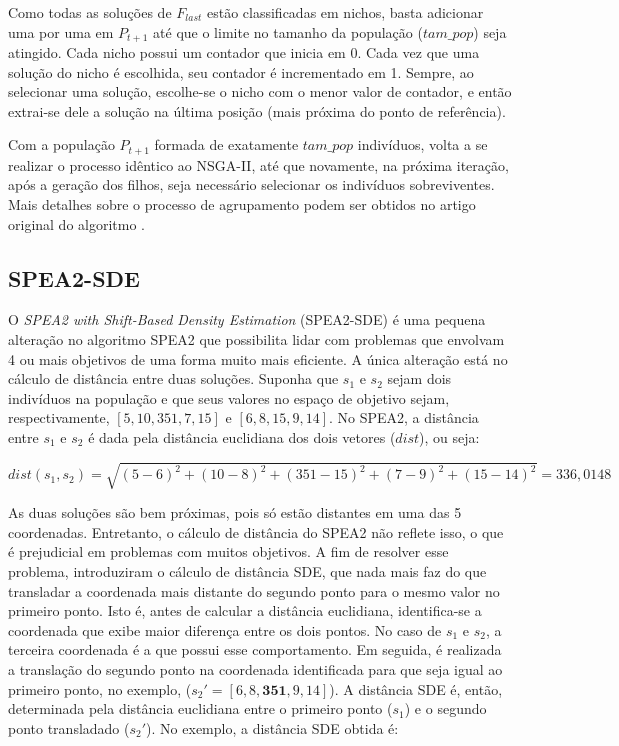 Como todas as soluções de $F_{last}$ estão classificadas em nichos, basta adicionar uma por uma em $P_{t+1}$ até que o limite no tamanho da população ($tam\_pop$) seja atingido. Cada nicho possui um contador que inicia em 0. Cada vez que uma solução do nicho é escolhida, seu contador é incrementado em 1. Sempre, ao selecionar uma solução, escolhe-se o nicho com o menor valor de contador, e então extrai-se dele a solução na última posição (mais próxima do ponto de referência).

Com a população $P_{t+1}$ formada de exatamente $tam\_pop$ indivíduos, volta a se realizar o processo idêntico ao NSGA-II, até que novamente, na próxima iteração, após a geração dos filhos, seja necessário selecionar os indivíduos sobreviventes. Mais detalhes sobre o processo de agrupamento podem ser obtidos no artigo original do algoritmo \cite{Deb2014}.

\subsection{SPEA2-SDE}

O \textit{SPEA2 with Shift-Based Density Estimation} (SPEA2-SDE) \cite{Spea2SDE} é uma pequena alteração no algoritmo SPEA2 que possibilita lidar com problemas que envolvam 4 ou mais objetivos de uma forma muito mais eficiente. A única alteração está no cálculo de distância entre duas soluções. Suponha que $s_1$ e $s_2$ sejam dois indivíduos na população e que seus valores no espaço de objetivo sejam, respectivamente, $[5, 10, 351, 7, 15]$ e $[6, 8, 15, 9, 14]$. No SPEA2, a distância entre $s_1$ e $s_2$ é dada pela distância euclidiana dos dois vetores ($dist$), ou seja:

\begin{equation}dist(s_1, s_2) = \sqrt{(5-6)^2 + (10-8)^2 + (351-15)^2 + (7-9)^2 + (15-14)^2} = 336,0148\end{equation}

As duas soluções são bem próximas, pois só estão distantes em uma das 5 coordenadas. Entretanto, o cálculo de distância do SPEA2 não reflete isso, o que é prejudicial em problemas com muitos objetivos. A fim de resolver esse problema, \cite{Spea2SDE} introduziram o cálculo de distância \ac{SDE}, que nada mais faz do que transladar a coordenada mais distante do segundo ponto para o mesmo valor no primeiro ponto. Isto é, antes de calcular a distância euclidiana, identifica-se a coordenada que exibe maior diferença entre os dois pontos. No caso de $s_1$ e $s_2$, a terceira coordenada é a que possui esse comportamento. Em seguida, é realizada a translação do segundo ponto na coordenada identificada para que seja igual ao primeiro ponto, no exemplo, ($s_2' = [6, 8, \textbf{351}, 9, 14]$). A distância SDE é, então, determinada pela distância euclidiana entre o primeiro ponto ($s_1$) e o segundo ponto transladado ($s_2'$). No exemplo, a distância SDE obtida é: 


